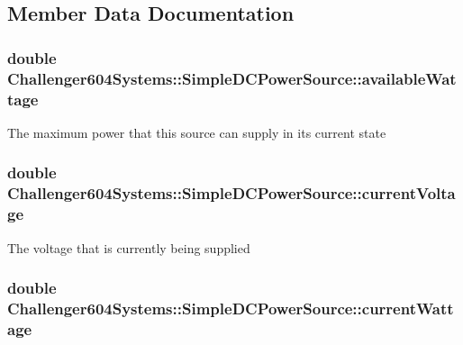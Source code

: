 \subsection{Member Data Documentation}
\hypertarget{class_challenger604_systems_1_1_simple_d_c_power_source_a1e32a5e348dca6e2043f539a434debd9}{
\subsubsection[{available\-Wattage}]{\setlength{\rightskip}{0pt plus 5cm}double Challenger604\-Systems\-::\-Simple\-D\-C\-Power\-Source\-::available\-Wattage\hspace{0.3cm}{\ttfamily [protected]}}}\label{class_challenger604_systems_1_1_simple_d_c_power_source_a1e32a5e348dca6e2043f539a434debd9}
The maximum power that this source can supply in its current state \hypertarget{class_challenger604_systems_1_1_simple_d_c_power_source_a6d5b229b66f1e6396229561e9a9562e4}{
\subsubsection[{current\-Voltage}]{\setlength{\rightskip}{0pt plus 5cm}double Challenger604\-Systems\-::\-Simple\-D\-C\-Power\-Source\-::current\-Voltage\hspace{0.3cm}{\ttfamily [protected]}}}\label{class_challenger604_systems_1_1_simple_d_c_power_source_a6d5b229b66f1e6396229561e9a9562e4}
The voltage that is currently being supplied \hypertarget{class_challenger604_systems_1_1_simple_d_c_power_source_a5c8c5b89f6d3cd3d332ee12ef893839c}{
\subsubsection[{current\-Wattage}]{\setlength{\rightskip}{0pt plus 5cm}double Challenger604\-Systems\-::\-Simple\-D\-C\-Power\-Source\-::current\-Wattage\hspace{0.3cm}{\ttfamily [protected]}}}\label{class_challenger604_systems_1_1_simple_d_c_power_source_a5c8c5b89f6d3cd3d332ee12ef893839c}
